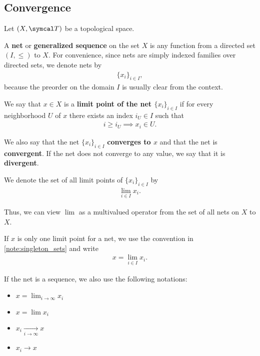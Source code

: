 \subsection{Convergence}\label{subsec:convergence}

Let \( (X, \Cal{T}) \) be a topological space.

\begin{definition}\label{def:topological_net}\cite[49]{Engelking1989}
  A \textbf{net} or \textbf{generalized sequence} on the set \( X \) is any function from a directed set \( (I, \leq) \) to \( X \). For convenience, since nets are simply indexed families over directed sets, we denote nets by
  \begin{align*}
    \{ x_i \}_{i \in I},
  \end{align*}
  because the preorder on the domain \( I \) is usually clear from the context.
\end{definition}

\begin{definition}\label{def:net_limit_point}\cite[49]{Engelking1989}
  We say that \( x \in X \) is a \textbf{limit point of the net \( \{ x_i \}_{i \in I} \)} if for every neighborhood \( U \) of \( x \) there exists an index \( i_U \in I \) such that
  \begin{align*}
    i \geq i_U \implies x_i \in U.
  \end{align*}

  We also say that the net \( \{ x_i \}_{i \in I} \) \textbf{converges to \( x \)} and that the net is \textbf{convergent}. If the net does not converge to any value, we say that it is \textbf{divergent}.

  We denote the set of all limit points of \( \{ x_i \}_{i \in I} \) by
  \begin{align*}
    \lim_{i \in I} x_i.
  \end{align*}

  Thus, we can view \( \lim \) as a multivalued operator from the set of all nets on \( X \) to \( X \).

  If \( x \) is only one limit point for a net, we use the convention in \cref{note:singleton_sets} and write
  \begin{align*}
    x = \lim_{i \in I} x_i.
  \end{align*}

  If the net is a sequence, we also use the following notations:
  \begin{itemize}
    \item \( x = \lim_{i \to \infty} x_i \)
    \item \( x = \lim x_i \)
    \item \( x_i \xrightarrow[i \to \infty]{} x \)
    \item \( x_i \to x \)
  \end{itemize}
\end{definition}

